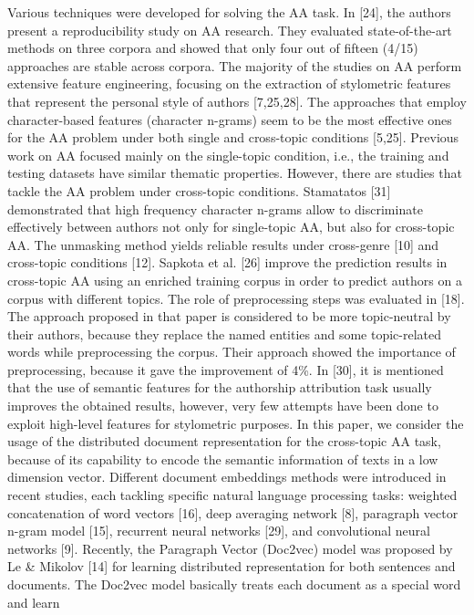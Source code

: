 \cite{gomez2018document}
Various techniques were developed for solving the AA task. In [24], the authors present
a reproducibility study on AA research. They evaluated state-of-the-art methods on
three corpora and showed that only four out of fifteen (4/15) approaches are stable
across corpora. The majority of the studies on AA perform extensive feature engineering, focusing on the extraction of stylometric features that represent the personal style
of authors [7,25,28]. The approaches that employ character-based features (character
n-grams) seem to be the most effective ones for the AA problem under both single
and cross-topic conditions [5,25].
Previous work on AA focused mainly on the single-topic condition, i.e., the training
and testing datasets have similar thematic properties. However, there are studies that
tackle the AA problem under cross-topic conditions. Stamatatos [31] demonstrated that
high frequency character n-grams allow to discriminate effectively between authors
not only for single-topic AA, but also for cross-topic AA. The unmasking method
yields reliable results under cross-genre [10] and cross-topic conditions [12]. Sapkota
et al. [26] improve the prediction results in cross-topic AA using an enriched training
corpus in order to predict authors on a corpus with different topics.
The role of preprocessing steps was evaluated in [18]. The approach proposed in
that paper is considered to be more topic-neutral by their authors, because they replace
the named entities and some topic-related words while preprocessing the corpus. Their
approach showed the importance of preprocessing, because it gave the improvement
of 4\%.
In [30], it is mentioned that the use of semantic features for the authorship attribution
task usually improves the obtained results, however, very few attempts have been done
to exploit high-level features for stylometric purposes. In this paper, we consider the
usage of the distributed document representation for the cross-topic AA task, because
of its capability to encode the semantic information of texts in a low dimension vector.
Different document embeddings methods were introduced in recent studies, each
tackling specific natural language processing tasks: weighted concatenation of word
vectors [16], deep averaging network [8], paragraph vector n-gram model [15], recurrent neural networks [29], and convolutional neural networks [9].
Recently, the Paragraph Vector (Doc2vec) model was proposed by Le \&
Mikolov [14] for learning distributed representation for both sentences and documents. The Doc2vec model basically treats each document as a special word and learn
